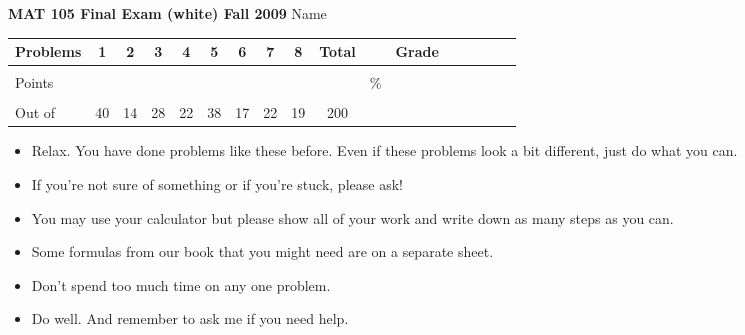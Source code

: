 \documentclass[12pt]{article}
\begin{document}
{\bf MAT 105 Final Exam (white) Fall 2009} \hspace{.4in} {\large Name} \hrulefill

\hspace{.2in}

\begin{center}

\begin{tabular}
{|l|c|c|c|c|c|c|c|c|c|c|c|c|c|c|c|c|} \hline

 Problems & \hspace{5 pt} 1 \hspace{5 pt}  & \hspace{5 pt} 2 \hspace{5 pt} & \hspace{5 pt} 3 \hspace{5 pt} & \hspace{5 pt} 4 \hspace{5 pt}& \hspace{5 pt} 5 \hspace{5 pt} & \hspace{5 pt} 6 \hspace{5 pt} & \hspace{5 pt} 7 \hspace{5 pt}   & \hspace{5 pt} 8 \hspace{5 pt} &  \hspace{5 pt} Total  \hspace{5 pt} & &  \hspace{5 pt} Grade \hspace{5 pt}  \\ \hline
&&&&&&&&&&&\\  
Points &&&&&&&&&&   \hspace{.6in}\% &  \\ 
&&&&&&&&&&& \\  \hline
Out of & 40  & 14 & 28 & 22 & 38 & 17 & 22 & 19 &200 & & \\ \hline

\end {tabular}
 
\end{center}

\hspace{.2in}

\begin{itemize}
\item Relax.  You have done problems like these before. Even if these problems look a bit different, just do what you can. 
\item  If you're not sure of something or if you're stuck, please ask! 
\item You may use your calculator but please show all of your work and write down as many steps as you can.  
\item Some formulas from our book that you might need are on a separate sheet.
\item Don't spend too much time on any one problem.
\item  Do well.  And remember to ask me if you need help.
\end{itemize}
\end{document}
